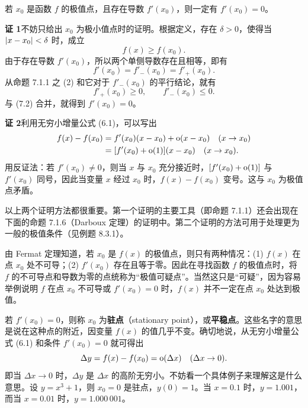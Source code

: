 \begin{xproposition}[7.1.2（Fermat 定理）]
若 $x_0$ 是函数 $f$ 的极值点，且存在导数 $f'(x_0)$，则一定有 $f'(x_0)=0$。
\end{xproposition}
\begin{xproof}
\textbf{证 1}\quad 不妨只给出 $x_0$ 为极小值点时的证明。根据定义，存在 $\delta>0$，使得当 $\lvert x-x_0\rvert<\delta$ 时，成立
\begin{equation}
  f(x)\geqslant f(x_0).
  \tag{7.1}
\end{equation}
由于存在导数 $f'(x_0)$，所以两个单侧导数存在且相等，即有
\begin{equation}
  f'(x_0)=f'_-(x_0)=f'_+(x_0).
  \tag{7.2}
\end{equation}
从命题 7.1.1 之 (2) 和它对于 $f'_-(x_0)$ 的平行结论，就有
\[
  f'_+(x_0)\geqslant0,\qquad f'_-(x_0)\leqslant0.
\]
与 (7.2) 合并，就得到 $f'(x_0)=0$。

\textbf{证 2}\quad 利用无穷小增量公式 (6.1)，可以写出
\[
  \begin{aligned}
    f(x)-f(x_0)&=f'(x_0)(x-x_0)+\mathrm{o}(x-x_0)\quad(x\to x_0)\\
    &=[f'(x_0)+\mathrm{o}(1)](x-x_0)\quad(x\to x_0).
  \end{aligned}
\]
用反证法：若 $f'(x_0)\neq0$，则当 $x$ 与 $x_0$ 充分接近时，$[f'(x_0)+\mathrm{o}(1)]$ 与 $f'(x_0)$ 同号，因此当变量 $x$ 经过 $x_0$ 时，$f(x)-f(x_0)$ 变号。这与 $x_0$ 为极值点矛盾。
\end{xproof}

\begin{xremark}
以上两个证明方法都很重要。第一个证明的主要工具（即命题 7.1.1）还会出现在下面的命题 7.1.6（Darboux 定理）的证明中。第二个证明的方法可用于处理更为一般的极值条件（见例题 8.3.1）。
\end{xremark}

\begin{xremark}
由 Fermat 定理知道，若 $x_0$ 是 $f(x)$ 的极值点，则只有两种情况：(1) $f(x)$ 在点 $x_0$ 处不可导；(2) $f'(x_0)$ 存在且等于零。因此在寻找函数 $f$ 的极值点时，将 $f$ 的不可导点和导数为零的点统称为“极值可疑点”。当然这只是“可疑”，因为容易举例说明 $f$ 在点 $x_0$ 不可导或 $f'(x_0)=0$ 时，$f(x)$ 并不一定在点 $x_0$ 处达到极值。
\end{xremark}

\begin{xremark}
若 $f'(x_0)=0$，则称 $x_0$ 为\textbf{驻点}（stationary point），或\textbf{平稳点}。这些名字的意思是说在这种点的附近，因变量 $f(x)$ 的值几乎不变。确切地说，从无穷小增量公式 (6.1) 和条件 $f'(x_0)=0$ 就可得出
\[
  \Delta y=f(x)-f(x_0)=\mathrm{o}(\Delta x)\quad(\Delta x\to0).
\]
即当 $\Delta x\to0$ 时，$\Delta y$ 是 $\Delta x$ 的高阶无穷小。不妨看一个具体例子来理解这是什么意思。设 $y=x^3+1$，则 $x_0=0$ 是驻点，$y(0)=1$。当 $x=0.1$ 时，$y=1.001$，而当 $x=0.01$ 时，$y=1.000\,001$。
\end{xremark}

